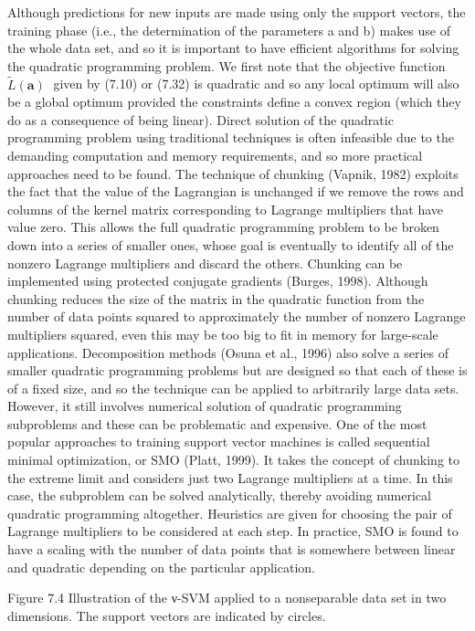 \documentclass[
  10
]{article}
\begin{document}
Although predictions for new inputs are made using only the support
vectors, the training phase (i.e., the determination of the parameters a
and b) makes use of the whole data set, and so it is important to have
efficient algorithms for solving the quadratic programming problem. We
first note that the objective function
\(\widetilde L ( \mathbf { a } )\) given by (7.10) or (7.32) is
quadratic and so any local optimum will also be a global optimum
provided the constraints define a convex region (which they do as a
consequence of being linear). Direct solution of the quadratic
programming problem using traditional techniques is often infeasible due
to the demanding computation and memory requirements, and so more
practical approaches need to be found. The technique of chunking
(Vapnik, 1982) exploits the fact that the value of the Lagrangian is
unchanged if we remove the rows and columns of the kernel matrix
corresponding to Lagrange multipliers that have value zero. This allows
the full quadratic programming problem to be broken down into a series
of smaller ones, whose goal is eventually to identify all of the nonzero
Lagrange multipliers and discard the others. Chunking can be implemented
using protected conjugate gradients (Burges, 1998). Although chunking
reduces the size of the matrix in the quadratic function from the number
of data points squared to approximately the number of nonzero Lagrange
multipliers squared, even this may be too big to fit in memory for
large-scale applications. Decomposition methods (Osuna et al., 1996)
also solve a series of smaller quadratic programming problems but are
designed so that each of these is of a fixed size, and so the technique
can be applied to arbitrarily large data sets. However, it still
involves numerical solution of quadratic programming subproblems and
these can be problematic and expensive. One of the most popular
approaches to training support vector machines is called sequential
minimal optimization, or SMO (Platt, 1999). It takes the concept of
chunking to the extreme limit and considers just two Lagrange
multipliers at a time. In this case, the subproblem can be solved
analytically, thereby avoiding numerical quadratic programming
altogether. Heuristics are given for choosing the pair of Lagrange
multipliers to be considered at each step. In practice, SMO is found to
have a scaling with the number of data points that is somewhere between
linear and quadratic depending on the particular application.

Figure 7.4 Illustration of the ν-SVM applied to a nonseparable data set
in two dimensions. The support vectors are indicated by circles.
\end{document}
